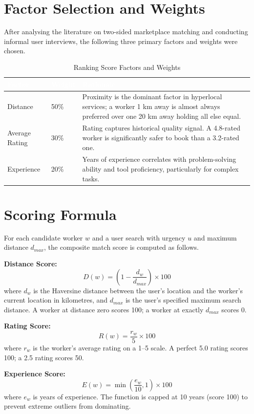 \documentclass[12pt,a4paper]{report}
\newcommand{\thead}[1]{\cellcolor{tableheader}\textcolor{white}{\textbf{#1}}}
\begin{document}
\section{Factor Selection and Weights}

After analysing the literature on two-sided marketplace matching and conducting informal user interviews, the following three primary factors and weights were chosen.

\begin{table}[h!]
\centering
\caption{Ranking Score Factors and Weights}
\renewcommand{\arraystretch}{1.3}
\begin{tabular}{|p{3cm}|p{1.5cm}|p{9cm}|}
\hline
\thead{Factor} & \thead{Weight} & \thead{Rationale} \\
\hline
Distance & 50\% & Proximity is the dominant factor in hyperlocal services; a worker 1 km away is almost always preferred over one 20 km away holding all else equal. \\
\hline
Average Rating & 30\% & Rating captures historical quality signal. A 4.8-rated worker is significantly safer to book than a 3.2-rated one. \\
\hline
Experience & 20\% & Years of experience correlates with problem-solving ability and tool proficiency, particularly for complex tasks. \\
\hline
\end{tabular}
\end{table}

\section{Scoring Formula}

For each candidate worker $w$ and a user search with urgency $u$ and maximum distance $d_{max}$, the composite match score is computed as follows.

\textbf{Distance Score:}
$$D(w) = \left(1 - \frac{d_w}{d_{max}}\right) \times 100$$
where $d_w$ is the Haversine distance between the user's location and the worker's current location in kilometres, and $d_{max}$ is the user's specified maximum search distance. A worker at distance zero scores 100; a worker at exactly $d_{max}$ scores 0.

\textbf{Rating Score:}
$$R(w) = \frac{r_w}{5} \times 100$$
where $r_w$ is the worker's average rating on a 1--5 scale. A perfect 5.0 rating scores 100; a 2.5 rating scores 50.

\textbf{Experience Score:}
$$E(w) = \min\left(\frac{e_w}{10}, 1\right) \times 100$$
where $e_w$ is years of experience. The function is capped at 10 years (score 100) to prevent extreme outliers from dominating.
\end{document}
